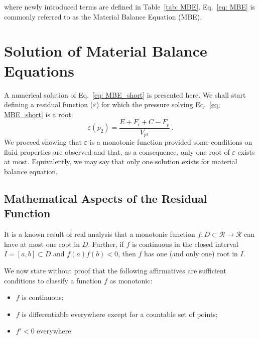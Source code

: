 \documentclass[authoryear,preprint,review,12pt]{elsarticle}
\begin{document}
where newly introduced terms are defined in Table~\ref{tab: MBE}. Eq.~\eqref{eq: MBE} is commonly referred to as the Material Balance Equation (MBE).

\section{Solution of Material Balance Equations}
A numerical solution of Eq.~\eqref{eq: MBE_short} is presented here. We shall start defining a residual function ($\varepsilon$) for which the pressure solving Eq.~\eqref{eq: MBE_short} is a root:
\begin{equation}\label{eq: residual}
\varepsilon(p_2) = \frac{E+F_i+C-F_p}{V_{p1}} \, .
\end{equation}
We proceed showing that $\varepsilon$ is a monotonic function provided some conditions on fluid properties are observed and that, as a consequence, only one root of $\varepsilon$ exists at most. Equivalently, we may say that only one solution exists for material balance equation.


\subsection{Mathematical Aspects of the Residual Function}

It is a known result of real analysis that a monotonic function $f:D\subset\mathcal{R}\rightarrow\mathcal{R}$ can have at most one root in $D$. Further, if $f$ is continuous in the closed interval $I=[a,b] \subset D$ and $f(a)f(b)<0$, then $f$ has one (and only one) root in $I$.

We now state without proof that the following affirmatives are sufficient conditions to classify a function $f$ as monotonic:
\begin{itemize}
\item $f$ is continuous;
\item $f$ is differentiable everywhere except for a countable set of points;
\item $f'<0$ everywhere.
\end{itemize}
\end{document}
